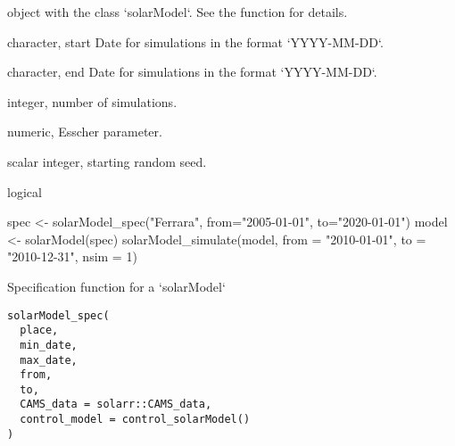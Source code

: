 \documentclass[a4paper]{book}
\begin{document}
%
\begin{Arguments}
\begin{ldescription}
\item[\code{model}] object with the class `solarModel`. See the function  for details.

\item[\code{from}] character, start Date for simulations in the format `YYYY-MM-DD`.

\item[\code{to}] character, end Date for simulations in the format `YYYY-MM-DD`.

\item[\code{nsim}] integer, number of simulations.

\item[\code{lambda}] numeric, Esscher parameter.

\item[\code{seed}] scalar integer, starting random seed.

\item[\code{quiet}] logical
\end{ldescription}
\end{Arguments}
%
\begin{Examples}
\begin{ExampleCode}
spec <- solarModel_spec("Ferrara", from="2005-01-01", to="2020-01-01")
model <- solarModel(spec)
solarModel_simulate(model, from = "2010-01-01", to = "2010-12-31", nsim = 1)

\end{ExampleCode}
\end{Examples}
%
\begin{Description}\relax
Specification function for a `solarModel`
\end{Description}
%
\begin{Usage}
\begin{verbatim}
solarModel_spec(
  place,
  min_date,
  max_date,
  from,
  to,
  CAMS_data = solarr::CAMS_data,
  control_model = control_solarModel()
)
\end{verbatim}
\end{Usage}
%
\end{document}

